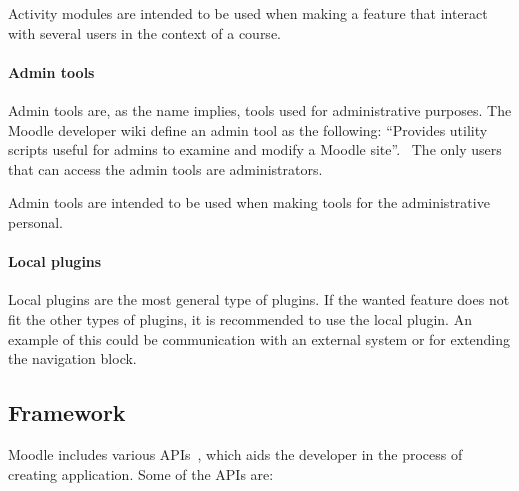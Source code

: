 Activity modules are intended to be used when making a feature that interact with several users in the context of a course.  

\paragraph{Admin tools}
Admin tools are, as the name implies, tools used for administrative purposes. 
The Moodle developer wiki define an admin tool as the following: 
``Provides utility scripts useful for admins to examine and modify a Moodle site''.~\cite{plugin} 
The only users that can access the admin tools are administrators. 

Admin tools are intended to be used when making tools for the administrative personal.

\paragraph{Local plugins}
Local plugins are the most general type of plugins. If the wanted feature does not fit the other types of plugins, it is recommended to use the local plugin. An example of this could be communication with an external system or for extending the navigation block. 




\subsection{Framework}
Moodle includes various APIs~\cite{moodlecoreapis}, which aids the developer in the process of creating application. Some of the APIs are:

